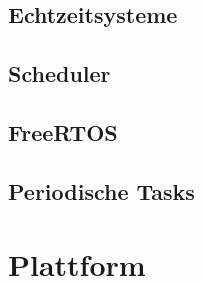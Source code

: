 \documentclass{scrartcl}
\begin{document}
		\subsection{Echtzeitsysteme}
			
		\subsection{Scheduler}
			
		\subsection{FreeRTOS}
			
		\subsection{Periodische Tasks}
			
		\clearpage
	\section{Plattform}
		
		\clearpage
	\listoffigures
		\clearpage
	\listoftables
		\printbibliography{}
		\clearpage
\end{document}
